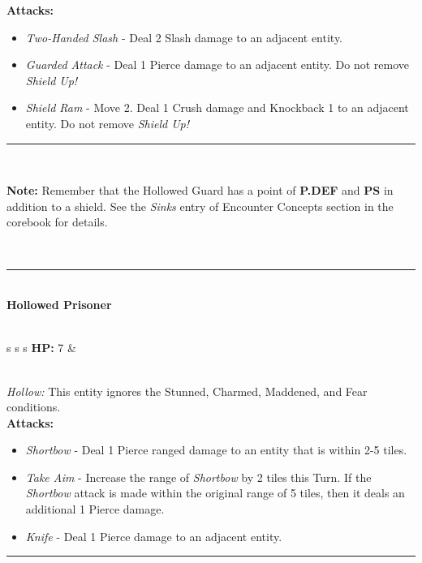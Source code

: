 \textbf{Attacks:}
\begin{itemize}
\item \emph{Two-Handed Slash} - Deal 2 Slash damage to an adjacent entity.
\item \emph{Guarded Attack} - Deal 1 Pierce damage to an adjacent entity. Do not remove \emph{Shield Up!}
\item \emph{Shield Ram} - Move 2. Deal 1 Crush damage and Knockback 1 to an adjacent entity. Do not remove \emph{Shield Up!}
\end{itemize}
\hrule
\ \\
\begin{tcolorbox}
\textbf{Note:} Remember that the Hollowed Guard has a point of \textbf{P.DEF} and \textbf{PS} in addition to a shield. See the \emph{Sinks} entry of Encounter Concepts section in the corebook for details.
\end{tcolorbox}
\ \\
\hrule
\ \\
{\large \textbf{Hollowed Prisoner}}\\\\
\begin{tabular}{s s s}
\textbf{HP:} 7 & \\
\end{tabular}\\

\emph{Hollow:} This entity ignores the Stunned, Charmed, Maddened, and Fear conditions.\\

\textbf{Attacks:}
\begin{itemize}
\item \emph{Shortbow} - Deal 1 Pierce ranged damage to an entity that is within 2-5 tiles.
\item \emph{Take Aim} - Increase the range of \emph{Shortbow} by 2 tiles this Turn. If the \emph{Shortbow} attack is made within the original range of 5 tiles, then it deals an additional 1 Pierce damage.
\item \emph{Knife} - Deal 1 Pierce damage to an adjacent entity.
\end{itemize}
\hrule
\ \\

